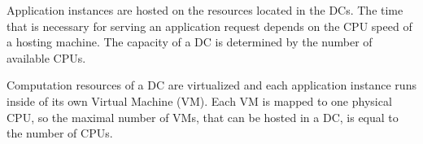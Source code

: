 
Application instances are hosted on the resources located in the \ac{DC}s.
The time that is necessary for serving an application request depends on the CPU speed of a hosting machine.
The capacity of a \ac{DC} is determined by the number of available CPUs. 


Computation resources of a \ac{DC} are virtualized and each application instance runs inside of its own Virtual Machine (VM). Each VM is mapped to one physical CPU, so the maximal number of VMs, that can be hosted in a \ac{DC}, is equal to the number of CPUs.

